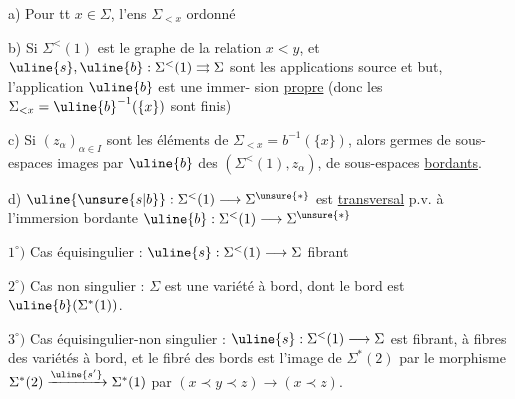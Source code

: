 
a) Pour tt $x\in\Sigma$, l'ens $\Sigma_{<x}$ 
 ordonné

b) Si $\Sigma^{<}(1)$ est le graphe de la relation
$x<y$, et $\uline{s},\uline{b}:\Sigma^{<}(1)\rightrightarrows\Sigma$ sont les applications
source et but, \deleted{\unsure{---}} l'application $\uline{b}$ est une immer-
sion  \uline{propre} (donc les $\Sigma_{<x}=\uline{b}^{-1}(\{x\})$
sont finis)

c) Si $(z_\alpha)_{\alpha\in I}$ sont les éléments de $\Sigma_{<x}=b^{-1}(\{x\})$,
alors  germes  de sous-espaces 
images par $\uline{b}$ des  $(\Sigma^{<}(1),z_\alpha)$, 
de sous-espaces \uline{bordants}.

d) $\uline{\unsure{s|b}}:\Sigma^{<}(1)\longrightarrow\Sigma^{\unsure{*}}$ est \uline{transversal} p.v. à l'immersion
bordante $\uline{b}:\Sigma^{<}(1)\longrightarrow\Sigma^{\unsure{*}}$

$1^{\circ})$ Cas équisingulier : $\uline{s}:\Sigma^{<}(1)\longrightarrow\Sigma$ fibrant 

$2^{\circ})$ Cas non singulier : $\Sigma$ est une variété à bord,
dont le bord est $\uline{b}(\Sigma^{*}(1))$.

$3^{\circ})$ Cas équisingulier-non singulier : $\uline{s}:\Sigma^{<}(1)\longrightarrow\Sigma$ est
fibrant,  à fibres des variétés à bord, et le
fibré des bords est l'image de $\Sigma^{*}(2)$ par
le morphisme $\Sigma^{*}(2)\xrightarrow{\uline{s'}}\Sigma^{*}(1)$ 
par $(x\prec y\prec z)\longrightarrow(x\prec z)$.

